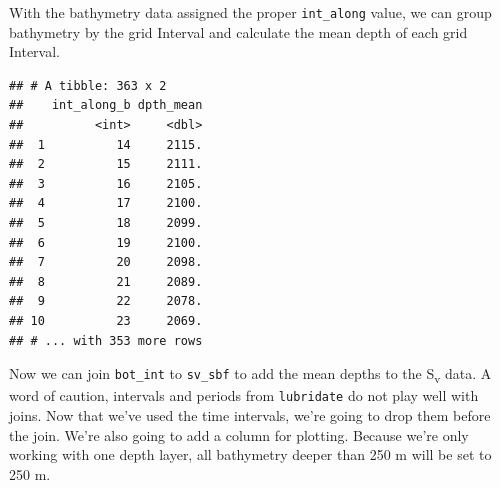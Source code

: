 \documentclass[]{article}
\newenvironment{Shaded}{\begin{snugshade}}{\end{snugshade}}
\newcommand{\DataTypeTok}[1]{\textcolor[rgb]{0.13,0.29,0.53}{#1}}
\newcommand{\DecValTok}[1]{\textcolor[rgb]{0.00,0.00,0.81}{#1}}
\newcommand{\KeywordTok}[1]{\textcolor[rgb]{0.13,0.29,0.53}{\textbf{#1}}}
\newcommand{\NormalTok}[1]{#1}
\newcommand{\OperatorTok}[1]{\textcolor[rgb]{0.81,0.36,0.00}{\textbf{#1}}}
\newcommand{\StringTok}[1]{\textcolor[rgb]{0.31,0.60,0.02}{#1}}
\begin{document}
With the bathymetry data assigned the proper \texttt{int\_along} value,
we can group bathymetry by the grid Interval and calculate the mean
depth of each grid Interval.

\begin{Shaded}
\end{Shaded}

\begin{verbatim}
## # A tibble: 363 x 2
##    int_along_b dpth_mean
##          <int>     <dbl>
##  1          14     2115.
##  2          15     2111.
##  3          16     2105.
##  4          17     2100.
##  5          18     2099.
##  6          19     2100.
##  7          20     2098.
##  8          21     2089.
##  9          22     2078.
## 10          23     2069.
## # ... with 353 more rows
\end{verbatim}

Now we can join \texttt{bot\_int} to \texttt{sv\_sbf} to add the mean
depths to the S\textsubscript{v} data. A word of caution, intervals and
periods from \texttt{lubridate} do not play well with joins. Now that
we've used the time intervals, we're going to drop them before the join.
We're also going to add a column for plotting. Because we're only
working with one depth layer, all bathymetry deeper than 250 m will be
set to 250 m.

\begin{Shaded}
\end{Shaded}
\end{document}
